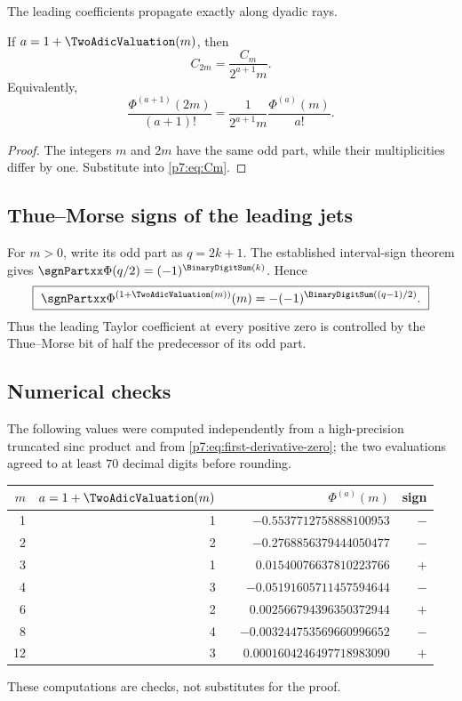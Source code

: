 \documentclass[11pt]{article}
\numberwithin{equation}{section}
\theoremstyle{definition}
\theoremstyle{remark}
\begin{document}
The leading coefficients propagate exactly along dyadic rays.

\begin{corollary}\label{p7:cor:dyadic-ray}
If $a=1+\TwoAdicValuation(m)$, then
\begin{equation}\label{p7:eq:C-ray}
 C_{2m}=\frac{C_m}{2^{a+1}m}.
\end{equation}
Equivalently,
\begin{equation}\label{p7:eq:der-ray}
 \frac{\Phi^{(a+1)}(2m)}{(a+1)!}
 =\frac1{2^{a+1}m}\frac{\Phi^{(a)}(m)}{a!}.
\end{equation}
\end{corollary}

\begin{proof}
The integers $m$ and $2m$ have the same odd part, while their multiplicities differ by one.  Substitute into \cref{p7:eq:Cm}.
\end{proof}

\subsection{Thue--Morse signs of the leading jets}

For $m>0$, write its odd part as $q=2k+1$.  The established interval-sign theorem gives $\sgnPartxx\Phi(q/2)=(-1)^{\BinaryDigitSum(k)}$.  Hence
\begin{equation}\label{p7:eq:jet-sign}
 \boxed{\ \sgnPartxx\Phi^{(1+\TwoAdicValuation(m))}(m)
 =-(-1)^{\BinaryDigitSum((q-1)/2)}.\ }
\end{equation}
Thus the leading Taylor coefficient at every positive zero is controlled by the Thue--Morse bit of half the predecessor of its odd part.

\subsection{Numerical checks}

The following values were computed independently from a high-precision truncated sinc product and from \cref{p7:eq:first-derivative-zero}; the two evaluations agreed to at least $70$ decimal digits before rounding.
\begin{center}
\begin{tabular}{@{}rrrr@{}}
\toprule
$m$ & $a=1+\TwoAdicValuation(m)$ & $\Phi^{(a)}(m)$ & sign\\
\midrule
1  & 1 & $-0.5537712758888100953$ & $-$\\
2  & 2 & $-0.2768856379444050477$ & $-$\\
3  & 1 & $\phantom{-}0.01540076637810223766$ & $+$\\
4  & 3 & $-0.05191605711457594644$ & $-$\\
6  & 2 & $\phantom{-}0.002566794396350372944$ & $+$\\
8  & 4 & $-0.003244753569660996652$ & $-$\\
12 & 3 & $\phantom{-}0.0001604246497718983090$ & $+$\\
\bottomrule
\end{tabular}
\end{center}
These computations are checks, not substitutes for the proof.
\end{document}

